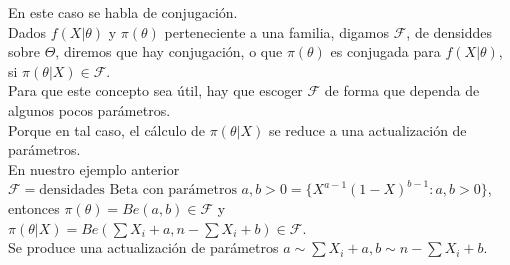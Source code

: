 \documentclass[10pt]{article}
\theoremstyle{plain}
\theoremstyle{definition}
\begin{document}
En este caso se habla de conjugación.\\
Dados $f(X|\theta)$ y $\pi(\theta)$ perteneciente a una familia, digamos $\mathcal{F}$, de densiddes sobre $\Theta$, diremos que hay conjugación, o que $\pi(\theta)$ es conjugada para $f(X|\theta)$, si $\pi(\theta|X) \in \mathcal{F}$.\\

Para que este concepto sea útil, hay que escoger $\mathcal{F}$ de forma que dependa de algunos pocos parámetros.\\

Porque en tal caso, el cálculo de $\pi(\theta|X)$ se reduce a una actualización de parámetros.\\

En nuestro ejemplo anterior $\mathcal{F} = \text{densidades Beta con parámetros $a,b>0$} = \{ X^{a-1}(1-X)^{b-1}\colon a,b>0\}$, entonces $\pi(\theta) = Be(a,b) \in \mathcal{F}$ y $\pi(\theta|X) = Be(\sum X_{i} +a, n- \sum X_{i}+b) \in \mathcal{F}$.\\

Se produce una actualización de parámetros $a\sim \sum X_{i}+a, b \sim n-\sum X_{i}+b$.\\
\end{document}
